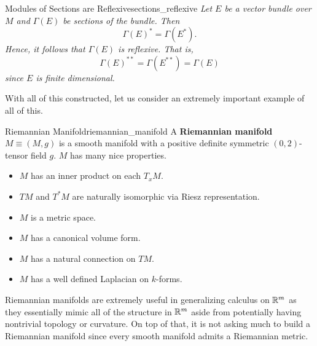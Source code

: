\begin{thm}{Modules of Sections are Reflexive}{sections_reflexive}
\emph{Let $E$ be a vector bundle over $M$ and $\Gamma(E)$ be sections of the bundle. Then}
\[
\Gamma(E)^* = \Gamma(E^*).
\]
\emph{Hence, it follows that $\Gamma(E)$ is reflexive. That is,}
\[
\Gamma(E)^{**}=\Gamma(E^{**})=\Gamma(E)
\]
\emph{since $E$ is finite dimensional.}
\end{thm}

With all of this constructed, let us consider an extremely important example of all of this.  

\begin{ex}{Riemannian Manifold}{riemannian_manifold}
A \textbf{Riemannian manifold} $M\equiv(M,g)$ is a smooth manifold with a positive definite symmetric $(0,2)$-tensor field $g$. $M$ has many nice properties.
\begin{itemize}
    \item $M$ has an inner product on each $T_xM$.
    \item $TM$ and $T^*M$ are naturally isomorphic via Riesz representation.
    \item $M$ is a metric space.
    \item $M$ has a canonical volume form.
    \item $M$ has a natural connection on $TM$.
    \item $M$ has a well defined Laplacian on $k$-forms.
\end{itemize}
\end{ex}

Riemannian manifolds are extremely useful in generalizing calculus on $\mathbb{R}^m$ as they essentially mimic all of the structure in $\mathbb{R}^m$ aside from potentially having nontrivial topology or curvature.  On top of that, it is not asking much to build a Riemannian manifold since every smooth manifold admits a Riemannian metric.